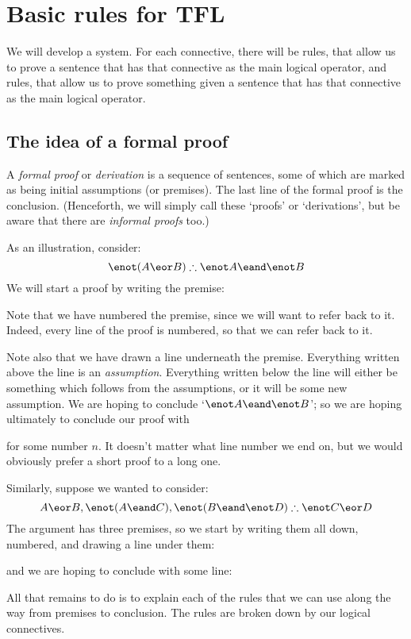 \chapter{Basic rules for TFL}\label{s:BasicTFL}
We will develop a  system. For each connective, there will be  rules, that allow us to prove a sentence that has that connective as the main logical operator, and  rules, that allow us to prove something given a sentence that has that connective as the main logical operator.

\section{The idea of a formal proof}
A \emph{formal proof} or \emph{derivation} is a sequence of sentences,
some of which are marked as being initial assumptions (or premises).
The last line of the formal proof is the conclusion. (Henceforth, we
will simply call these `proofs' or `derivations', but be aware that
there are \emph{informal proofs} too.)

As an illustration, consider:
	$$\enot (A \eor B) \therefore \enot A \eand \enot B$$
We will start a proof by writing the premise:
\begin{fitchproof}
\end{fitchproof}
Note that we have numbered the premise, since we will want to refer back to it. Indeed, every line of the proof is numbered, so that we can refer back to it.

Note also that we have drawn a line underneath the premise. Everything written above the line is an \emph{assumption}. Everything written below the line will either be something which follows from the assumptions, or it will be some new assumption. We are hoping to conclude `$\enot A \eand \enot B$'; so we are hoping ultimately to conclude our proof with
\begin{fitchproof}
\end{fitchproof}
for some number $n$. It doesn't matter what line number we end on, but we would obviously prefer a short proof to a long one.

Similarly, suppose we wanted to consider:
$$A\eor B, \enot (A\eand C), \enot (B \eand \enot D) \therefore \enot C\eor D$$
The argument has three premises, so we start by writing them all down, numbered, and drawing a line under them:
\begin{fitchproof}
\end{fitchproof}
and we are hoping to conclude with some line:
\begin{fitchproof}
\end{fitchproof}
All that remains to do is to explain each of the rules that we can use along the way from premises to conclusion. The rules are broken down by our logical connectives.

